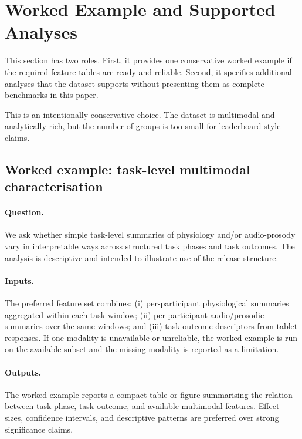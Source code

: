\documentclass{article}
\begin{document}
\section{Worked Example and Supported Analyses}
\label{sec:worked}

This section has two roles.
First, it provides one conservative worked example if the required feature
tables are ready and reliable.
Second, it specifies additional analyses that the dataset supports without
presenting them as complete benchmarks in this paper.

This is an intentionally conservative choice.
The dataset is multimodal and analytically rich, but the number of groups is
too small for leaderboard-style claims.

\subsection{Worked example: task-level multimodal characterisation}
\label{sec:worked_example}


\paragraph{Question.}
We ask whether simple task-level summaries of physiology and/or audio-prosody
vary in interpretable ways across structured task phases and task outcomes.
The analysis is descriptive and intended to illustrate use of the release
structure.

\paragraph{Inputs.}
The preferred feature set combines:
(i) per-participant physiological summaries aggregated within each task window;
(ii) per-participant audio/prosodic summaries over the same windows; and
(iii) task-outcome descriptors from tablet responses.
If one modality is unavailable or unreliable, the worked example is run on the
available subset and the missing modality is reported as a limitation.

\paragraph{Outputs.}
The worked example reports a compact table or figure summarising the relation
between task phase, task outcome, and available multimodal features.
Effect sizes, confidence intervals, and descriptive patterns are preferred over
strong significance claims.
\end{document}
